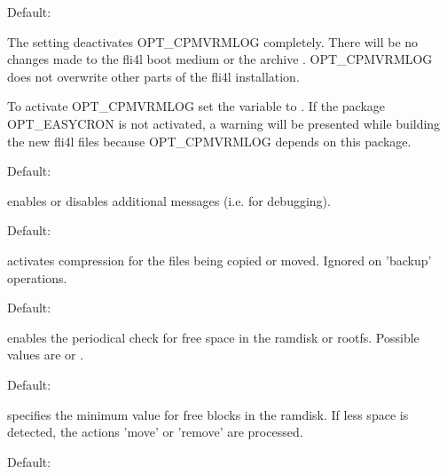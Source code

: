 \begin{description}


  Default: 

  The setting  deactivates OPT\_CPMVRMLOG completely. There will be no changes made
  to the fli4l boot medium or the archive .
  OPT\_CPMVRMLOG does not overwrite other parts of the fli4l installation.

  To activate OPT\_CPMVRMLOG set the variable  to .
  If the package OPT\_EASYCRON is not activated, a warning will be presented while
  building the new fli4l files because OPT\_CPMVRMLOG depends on this package.
  

  Default: 

   enables or disables additional messages (i.e. for debugging).\\


  Default: 
  
   activates compression for the files being copied or moved.
  Ignored on 'backup' operations.\\
 

  Default: 

   enables the periodical check for free space in the 
  ramdisk or rootfs. Possible values are  or .\\
  

  Default: 

   specifies the minimum value for free blocks in the ramdisk.
  If less space is detected, the actions 'move' or 'remove' are processed.\\


  Default: 


\end{description}
